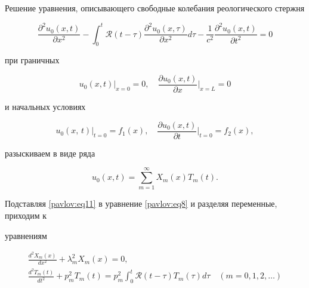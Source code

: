 Решение уравнения, описывающего свободные колебания реологического стержня

\begin{equation}

\label{pavlov:eq8}

\frac{\partial ^2u_0 (x,t)}{\partial x^2}-\int_0^t \mathcal{R}(

t-\tau)\frac{\partial^2u_0 (x,\tau )}{\partial x^2}d\tau

-\frac{1}{c^2}\frac{\partial^2u_0 (x,t)}{\partial t^2}=0

\end{equation}

при граничных

\begin{equation}

\label{pavlov:eq9}

u_0 (x,t) \Big |_{ x=0 } =0, \quad \frac{\partial u_0 ( x,t)}{\partial x}\Big|_{x=L}=0

\end{equation}

и начальных условиях

\begin{equation}

\label{pavlov:eq10}

u_0 (x,\,t) \Big |_{t=0} =f_1 ( x ), \quad \frac{\partial u_0(x,t)}{\partial t} \Big |_{t=0}=f_2 ( x ),

\end{equation}

разыскиваем в виде ряда

\begin{equation}

\label{pavlov:eq11}

u_0 (x,t)=\sum\limits_{m=1}^\infty X_m (x)T_m (t).

\end{equation}

Подставляя \eqref{pavlov:eq11} в уравнение \eqref{pavlov:eq8} и разделяя переменные, приходим к

уравнениям

\begin{gather}

\label{pavlov:eq12}

\frac{d^2X_m (x)}{dx^2}+\lambda _m^2 X_m (x)=0,\\

\label{pavlov:eq13}

\frac{d^2T_m (t)}{dt^2}+p_m^2 T_m ( t )=p_m^2 \int _0^t

\mathcal{R}(t-\tau ) T_m (\tau )d \tau \quad (m=0, 1, 2, \ldots)

\end{gather}

